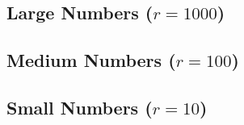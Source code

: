 
\begin{slide}
\section{Large Numbers ($r=1000$)}
\pause
\pb {}
\begin{center}
  \pause
\end{center}
\end{slide}


\begin{slide}
\section{Medium Numbers ($r=100$)}
\pause
\pb {}
\begin{center}
  \pause
\end{center}
\end{slide}


\begin{slide}
\section{Small Numbers ($r=10$)}
\pause
\pb {}
\begin{center}
  \pause
\end{center}
\end{slide}




